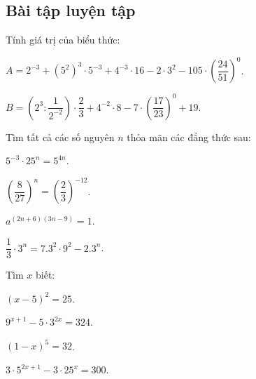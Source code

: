 \subsection{Bài tập luyện tập}
\begin{bt}%
	Tính giá trị của biểu thức:
	\begin{listEX}[]
		\item $A = 2^{-3} + \left( 5^2\right) ^3 \cdot 5^{-3} + 4^{-3} \cdot  16 - 2\cdot 3^2 - 105\cdot \left( \dfrac{24}{51}\right) ^0$.
		\item $B = \left( 2^3 : \dfrac{1}{2^{-2}}\right) \cdot \dfrac{2}{3} + 4^{-2} \cdot  8 - 7\cdot  \left( \dfrac{17}{23}\right) ^0 + 19$.
	\end{listEX}
\end{bt}

\begin{bt}%
	Tìm tất cả các số nguyên $n$ thỏa mãn các đẳng thức sau:
	\begin{listEX}[2]
		\item $5^{-3} \cdot  25^n = 5^{4n}$.
		\item $\left( \dfrac{8}{27}\right) ^n = \left( \dfrac{2}{3}\right) ^{-12}$.
		\item $a^{(2n+6)(3n-9)}= 1$.
		\item $\dfrac{1}{3}\cdot 3^n = 7.3^2\cdot 9^2 - 2.3^n$.
	\end{listEX}
\end{bt}

\begin{bt}%
	Tìm $x$ biết:
	\begin{listEX}[2]
		\item $(x-5)^2 = 25$.
		\item $9^{x+1} - 5\cdot 3^{2x} = 324$.
		\item $(1-x)^5 = 32$.
		\item $3\cdot 5^{2x+1} - 3\cdot 25^x = 300$.
	\end{listEX}
\end{bt}

